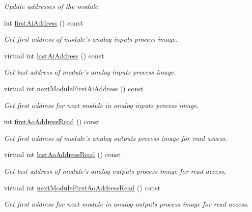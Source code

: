 \begin{DoxyCompactItemize}
\begin{DoxyCompactList}\small\item\em Update addresses of the module. \end{DoxyCompactList}\item 
int \hyperlink{classmdt_device_modbus_wago_module_a502dc2388ecf0531786c09964b4f7566}{first\-Ai\-Address} () const 
\begin{DoxyCompactList}\small\item\em Get first address of module's analog inputs process image. \end{DoxyCompactList}\item 
virtual int \hyperlink{classmdt_device_modbus_wago_module_a79e994d8cbcb222eced1b70a553ca33b}{last\-Ai\-Address} () const 
\begin{DoxyCompactList}\small\item\em Get last address of module's analog inputs process image. \end{DoxyCompactList}\item 
virtual int \hyperlink{classmdt_device_modbus_wago_module_a9a76569563743da0a493766658528bb6}{next\-Module\-First\-Ai\-Address} () const 
\begin{DoxyCompactList}\small\item\em Get first address for next module in analog inputs process image. \end{DoxyCompactList}\item 
int \hyperlink{classmdt_device_modbus_wago_module_acd623a8d9956fd79c11c01879afdc73c}{first\-Ao\-Address\-Read} () const 
\begin{DoxyCompactList}\small\item\em Get first address of module's analog outputs process image for read access. \end{DoxyCompactList}\item 
virtual int \hyperlink{classmdt_device_modbus_wago_module_a268157e43f93ae76f2950b98160a3a53}{last\-Ao\-Address\-Read} () const 
\begin{DoxyCompactList}\small\item\em Get last address of module's analog outputs process image for read access. \end{DoxyCompactList}\item 
virtual int \hyperlink{classmdt_device_modbus_wago_module_a76d102ba44dfc0777c8dbb5446665353}{next\-Module\-First\-Ao\-Address\-Read} () const 
\begin{DoxyCompactList}\small\item\em Get first address for next module in analog outputs process image for read access. \end{DoxyCompactList}\item 

\end{DoxyCompactItemize}
